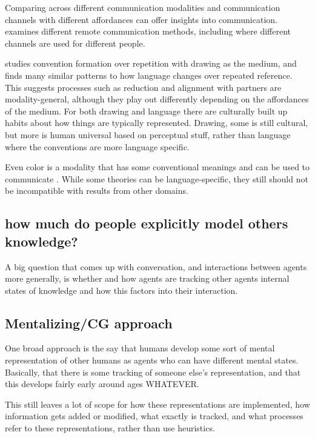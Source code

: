 \documentclass[]{article}
\begin{document}
Comparing across different communication modalities and communication channels with different affordances can offer insights into communication. \cite{foxtree2013} examines different remote communication methods, including where different channels are used for different people. 

\cite{hawkinsa} studies convention formation over repetition with drawing as the medium, and finds many similar patterns to how language changes over repeated reference. This suggests processes such as reduction and alignment with partners are modality-general, although they play out differently depending on the affordances of the medium. For both drawing and language there are culturally built up habits about how things are typically represented. Drawing, some is still cultural, but more is human universal based on perceptual stuff, rather than language where the conventions are more language specific. 

Even color is a modality that has some conventional meanings and can be used to communicate \cite{murthy2022}. While some theories can be language-specific, they still should not be incompatible with results from other domains. 



\subsection{how much do people explicitly model others knowledge?}

A big question that comes up with conversation, and interactions between agents more generally, is whether and how agents are tracking other agents internal states of knowledge and how this factors into their interaction. 

\subsection{Mentalizing/CG approach}
One broad approach is the say that humans develop some sort of mental representation of other humans as agents who can have different mental states. Basically, that there is some tracking of someone else's representation, and that this develops fairly early around ages WHATEVER. 

This still leaves a lot of scope for how these representations are implemented, how information gets added or modified, what exactly is tracked, and what processes refer to these representations, rather than use heuristics. 
\end{document}
